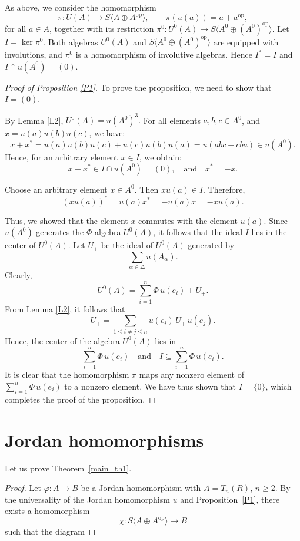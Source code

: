 \documentclass[12pt]{amsart}
\begin{document}
{As above, we consider the  homomorphism 
\[
\pi \colon U(A) \to S\langle   A\oplus A^{\text{op}}\rangle, \qquad  \pi(u(a)) = a +a^{\text{op}},
\]
for all  \( a \in A \), together with its restriction $
\pi^0 \colon U^0(A) \to S\langle   A^0\oplus (A^0)^{\text{op}}\rangle.$ Let \( I = \ker \pi^0 \). Both algebras $U^0(A)$ and $S\langle   A^0\oplus (A^0)^{\text{op}}\rangle$ are equipped with  involutions, and $\pi^0$  is a homomorphism of involutive algebras. Hence \( I^* = I \) and \( I \cap u(A^0) = (0) \).

\begin{proof}[Proof of Proposition \ref{P1}] To prove the proposition, we need to show that  $I = (0).$

By Lemma \ref{L2},  $U^0(A) = u(A^0)^3.$ For all elements \( a,b,c \in A^0 \), and $x=u(a) u(b) u(c)$, we have:
\[
x+ x^*=u(a) u(b) u(c)+ u(c) u(b) u(a) = u(abc + cba) \in u(A^0).
\]
Hence, for an arbitrary element \( x \in I \), we obtain:
\[
x+ x^* \in I \cap u(A^0) = (0), \quad \text{and} \quad x^* =- x .
\]

Choose an arbitrary element \( x \in A^0 \). Then \( x u(a) \in I \). Therefore,
\[
(x u(a))^* = u(a) x^*  = - u(a) x= - x u(a).
\]




Thus, we showed that the element $x$ commutes with the element $u(a)$. Since $u(A^0)$ generates the $\Phi$-algebra $U^0(A)$, it follows that the ideal $I$ lies in the center of $U^0(A)$.	Let $U_+$ be the ideal of $U^0(A)$ generated by
	\[
	\sum_{\alpha \in \Delta} u(A_\alpha). 
	\]
	Clearly, 
	\[
	U^0(A) = \sum_{i=1}^{n} \Phi \, u(e_i) + U_+.
	\]	From Lemma \ref{L2}, it follows that
	\[
	U_+ = \sum_{1 \leq i \not= j \leq n} u(e_i) \, U_+ \, u(e_j).
	\]	Hence, the center of the algebra $U^0(A)$ lies in 
	\[
	\sum_{i=1}^{n} \Phi \, u(e_i) \quad \text{and} \quad I \subseteq \sum_{i=1}^{n} \Phi \, u(e_i).
	\]
	It is clear that the homomorphism $\pi$ maps any nonzero element of $\sum_{i=1}^{n} \Phi \, u(e_i)$ to a nonzero element. We have thus shown that  $I = \{0\}$, which completes the proof of the proposition. \end{proof}



\section{Jordan homomorphisms}\label{Sec3}

Let us prove Theorem~\ref{main_th1}.
\begin{proof}
	Let $\varphi : A \to B$ be a Jordan homomorphism with $A = T_n(R)$, $n \geq 2$. 
	By the universality of the Jordan homomorphism $u$ and Proposition~\ref{P1}, 
	there exists a homomorphism
	\[
	\chi : S\langle   A\oplus A^{\text{op}}\rangle \to B
	\]
	such that the diagram
	

\end{proof}}
\end{document}
